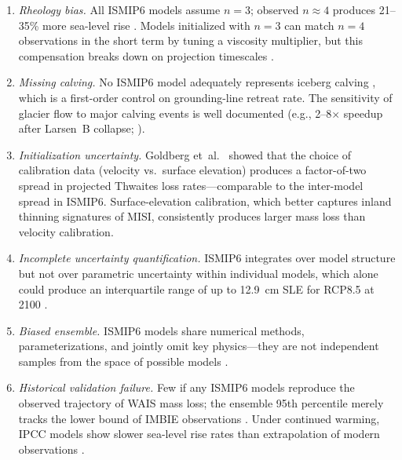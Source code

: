 \documentclass[12pt]{article}
\begin{document}
\begin{enumerate}
\item \textit{Rheology bias.} All ISMIP6 models assume $n = 3$; observed $n \approx 4$ produces 21--35\% more sea-level rise \citep{Martin2026, GetraerMorlighem2025}. Models initialized with $n = 3$ can match $n = 4$ observations in the short term by tuning a viscosity multiplier, but this compensation breaks down on projection timescales \citep{Martin2026}.

\item \textit{Missing calving.} No ISMIP6 model adequately represents iceberg calving \citep{Aschwanden2021, Fricker2025}, which is a first-order control on grounding-line retreat rate. The sensitivity of glacier flow to major calving events is well documented (e.g., 2--8$\times$ speedup after Larsen~B collapse; \cite{Scambos2004}).

\item \textit{Initialization uncertainty.} Goldberg et~al.~\citep{Goldberg2026} showed that the choice of calibration data (velocity vs.\ surface elevation) produces a factor-of-two spread in projected Thwaites loss rates---comparable to the inter-model spread in ISMIP6. Surface-elevation calibration, which better captures inland thinning signatures of MISI, consistently produces larger mass loss than velocity calibration.

\item \textit{Incomplete uncertainty quantification.} ISMIP6 integrates over model structure but not over parametric uncertainty within individual models, which alone could produce an interquartile range of up to 12.9~cm SLE for RCP8.5 at 2100 \citep{Aschwanden2019}.

\item \textit{Biased ensemble.} ISMIP6 models share numerical methods, parameterizations, and jointly omit key physics---they are not independent samples from the space of possible models \citep{Aschwanden2021}.

\item \textit{Historical validation failure.} Few if any ISMIP6 models reproduce the observed trajectory of WAIS mass loss; the ensemble 95th percentile merely tracks the lower bound of IMBIE observations \citep{Aschwanden2021}. Under continued warming, IPCC models show slower sea-level rise rates than extrapolation of modern observations \citep{Hamlington2024}.
\end{enumerate}

\end{document}
